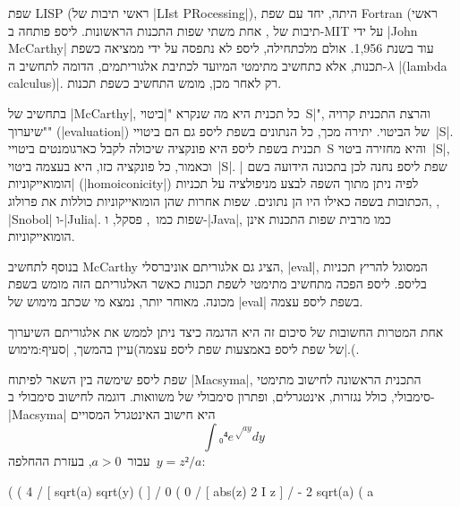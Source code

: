 שפת LISP (ראשי תיבות של \E|LIst PRocessing|), היתה, יחד עם שפת Fortran (ראשי
תיבות של , אחת משתי שפות התכנות הראשונות. ליספ פותחה
ב-MIT על ידי \E|John McCarthy| עוד בשנת 1,956. אולם מלכתחילה, ליספ לא נתפסה על
ידי ממציאה כשפת תכנות, אלא כתחשיב מתימטי המיועד לכתיבת אלגוריתמים, הדומה לתחשיב
ה-$λ$ \E|(lambda calculus)|. רק לאחר מכן, מומש התחשיב כשפת תכנות.

בתחשיב של \E|McCarthy|, כל תכנית היא מה שנקרא "\ע|ביטוי~S|", והרצת התכנית קרויה
"שיערוך" (\E|evaluation|) של הביטוי. יתירה מכך, כל הנתונים בשפת ליספ גם הם
ביטויי~\E|S|. תכנית בשפת ליספ היא פונקציה שיכולה לקבל כארגומנטים ביטויי~S והיא
מחזירה ביטוי~\E|S|, וכאמור, כל פונקציה כזו, היא בעצמה ביטוי~\E|S|. שפת ליספ
נחנה לכן בתכונה הידועה בשם \ע|הומואייקוניות| (\E|homoiconicity|) לפיה ניתן מתוך
השפה לבצע מניפולציה על תכניות הכתובות בשפה כאילו היו הן נתונים. שפות אחרות שהן
הומואייקוניות כוללות את פרולוג, , \E|Snobol|
ו-\E|Julia|. שפות כמו~\CPL, פסקל, ו-\E|Java|, כמו מרבית שפות התכנות אינן
הומואייקוניות.

בנוסף לתחשיב McCarthy הציג גם אלגוריתם אוניברסלי, \E|eval|, המסוגל להריץ תכניות
בליספ. ליספ הפכה מתחשיב מתימטי לשפת תכנות כאשר האלגוריתם הזה מומש בשפת מכונה.
מאוחר יותר, נמצא מי שכתב מימוש של \E|eval| בשפת ליספ עצמה.

אחת המטרות החשובות של סיכום זה היא הדגמה כיצד ניתן לממש את אלגוריתם השיערוך של
שפת ליספ באמצעות שפת ליספ עצמה)עיין בהמשך, |סעיף:מימוש|.(.

שפת ליספ שימשה בין השאר לפיתוח \E|Macsyma|, התכנית הראשונה לחישוב מתימטי
סימבולי, כולל נגזרות, אינטגרלים, ופתרון סימבולי של משוואות.
דוגמה לחישוב סימבולי ב-\E|Macsyma| היא חישוב האינטגרל המסויים \[
  ∫₀⁴ e^{√{ay}}dy
\] עבור~$a>0$, בעזרת ההחלפה~$y=z²/a$:

\begin{minipage}\linewidth
\begin{LTR}
  \scriptsize
  \begin{LISP}
(%
(%
                      4
                     /
                     [ sqrt(a) sqrt(y) (%
                     ]
                     /
                      0
(%
                      0
                     /
                     [ abs(z)
                   2 I z %
                     ]
                     /
- 2 sqrt(a)
(%
                                a
\end{LISP}
\end{LTR}
\end{minipage}

